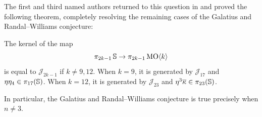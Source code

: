 The first and third named authors returned to this question in \cite{ManSmall} and proved the following theorem, completely resolving the remaining cases of the Galatius and Randal--Williams conjecture:
\begin{thm}
  The kernel of the map
  \[\pi_{2k-1} \operatorname{\mathbb{S}} \to \pi_{2k-1} \operatorname{\mathrm{MO}} \langle k \rangle\]
  is equal to $\mathcal{J}_{2k-1}$ if $k \neq 9,12$.
  When $k=9$, it is generated by $\mathcal{J}_{17}$ and $\eta \eta_4 \in \pi_{17} (\operatorname{\mathbb{S}})$.
  When $k=12$, it is generated by $\mathcal{J}_{23}$ and $\eta^3 \overline{\kappa} \in \pi_{23} (\operatorname{\mathbb{S}})$.

  In particular, the Galatius and Randal--Williams conjecture is true precisely when $n \neq 3$.
\end{thm}
%
%
%
%
%

